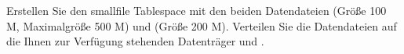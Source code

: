    \item Erstellen Sie den smallfile Tablespace  mit den beiden Datendateien  (Gr\"o\ss{}e 100 M, Maximalgr\"o\ss{}e 500 M) und  (Gr\"o\ss{}e 200 M). Verteilen Sie die Datendateien auf die Ihnen zur Verf\"ugung stehenden Datentr\"ager  und .
